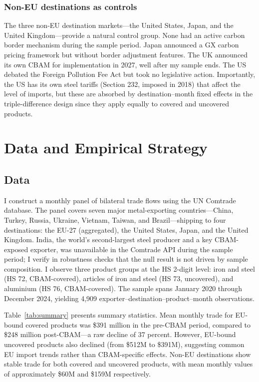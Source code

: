 \documentclass[12pt]{article}
\begin{document}
\subsubsection*{Non-EU destinations as controls} The three non-EU destination markets---the United States, Japan, and the United Kingdom---provide a natural control group. None had an active carbon border mechanism during the sample period. Japan announced a GX carbon pricing framework but without border adjustment features. The UK announced its own CBAM for implementation in 2027, well after my sample ends. The US debated the Foreign Pollution Fee Act but took no legislative action. Importantly, the US has its own steel tariffs (Section 232, imposed in 2018) that affect the level of imports, but these are absorbed by destination--month fixed effects in the triple-difference design since they apply equally to covered and uncovered products.

\section{Data and Empirical Strategy}

\subsection{Data}

I construct a monthly panel of bilateral trade flows using the UN Comtrade database. The panel covers seven major metal-exporting countries---China, Turkey, Russia, Ukraine, Vietnam, Taiwan, and Brazil---shipping to four destinations: the EU-27 (aggregated), the United States, Japan, and the United Kingdom. India, the world's second-largest steel producer and a key CBAM-exposed exporter, was unavailable in the Comtrade API during the sample period; I verify in robustness checks that the null result is not driven by sample composition. I observe three product groups at the HS 2-digit level: iron and steel (HS 72, CBAM-covered), articles of iron and steel (HS 73, uncovered), and aluminium (HS 76, CBAM-covered). The sample spans January 2020 through December 2024, yielding 4,909 exporter--destination--product--month observations.

Table~\ref{tab:summary} presents summary statistics. Mean monthly trade for EU-bound covered products was \$391 million in the pre-CBAM period, compared to \$248 million post-CBAM---a raw decline of 37 percent. However, EU-bound uncovered products also declined (from \$512M to \$391M), suggesting common EU import trends rather than CBAM-specific effects. Non-EU destinations show stable trade for both covered and uncovered products, with mean monthly values of approximately \$60M and \$159M respectively.
\end{document}

